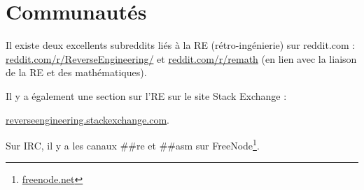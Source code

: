 \chapter{Communautés}

Il existe deux excellents subreddits liés à la \ac{RE} (rétro-ingénierie) sur reddit.com :\\
\href{http://go.yurichev.com/17027}{reddit.com/r/ReverseEngineering/} et
\href{http://go.yurichev.com/17028}{reddit.com/r/remath}
(en lien avec la liaison de la \ac{RE} et des mathématiques).

Il y a également une section sur l'\ac{RE} sur le site Stack Exchange :

\par \href{http://go.yurichev.com/17029}{reverseengineering.stackexchange.com}.

Sur IRC, il y a les canaux \#\#re et \#\#asm sur
FreeNode\footnote{\href{http://go.yurichev.com/17030}{freenode.net}}.

